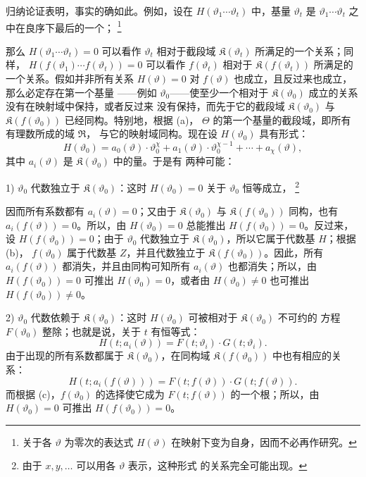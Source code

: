 \documentclass[11pt]{article}
\providecommand{\Kfield}{\mathfrak K}
\providecommand{\Rfield}{\mathfrak R}
\providecommand{\srcfn}[2]{%
  \begingroup\renewcommand{\thefootnote}{#1}\footnote{#2}\addtocounter{footnote}{-1}\endgroup}
\begin{document}
归纳论证表明，事实的确如此。例如，设在
\(H(\vartheta_1\cdots\vartheta_t)\) 中，基量 \(\vartheta_t\) 是
\(\vartheta_1\cdots\vartheta_t\) 之中在良序下最后的一个；
\srcfn{**)}{关于各 \(\vartheta\) 为零次的表达式 \(H(\vartheta)\)
在映射下变为自身，因而不必再作研究。} 那么
\(H(\vartheta_1\cdots\vartheta_t)=0\) 可以看作 \(\vartheta_t\)
相对于截段域 \(\Kfield(\vartheta_t)\) 所满足的一个关系；同样，
\(H(f(\vartheta_1)\cdots f(\vartheta_t))=0\) 可以看作
\(f(\vartheta_t)\) 相对于 \(\Kfield(f(\vartheta_t))\) 所满足的
一个关系。假如并非所有关系 \(H(\vartheta)=0\) 对
\(f(\vartheta)\) 也成立，且反过来也成立，那么必定存在第一个基量
——例如 \(\vartheta_0\)——使至少一个相对于
\(\Kfield(\vartheta_0)\) 成立的关系没有在映射域中保持，或者反过来
没有保持，而先于它的截段域 \(\Kfield(\vartheta_0)\) 与
\(\Kfield(f(\vartheta_0))\) 已经同构。特别地，根据 (a)，
\(\Theta\) 的第一个基量的截段域，即所有有理数所成的域 \(\Rfield\)，
与它的映射域同构。现在设 \(H(\vartheta_0)\) 具有形式：
\[
H(\vartheta_0)=a_0(\vartheta)\cdot\vartheta_0^\chi
+a_1(\vartheta)\cdot\vartheta_0^{\chi-1}+\cdots+a_\chi(\vartheta),
\]
其中 \(a_i(\vartheta)\) 是 \(\Kfield(\vartheta_0)\) 中的量。于是有
两种可能：

1) \(\vartheta_0\) 代数独立于 \(\Kfield(\vartheta_0)\)：这时
\(H(\vartheta_0)=0\) 关于 \(\vartheta_0\) 恒等成立，
\srcfn{*)}{由于 \(x,y,\ldots\) 可以用各 \(\vartheta\) 表示，这种形式
的关系完全可能出现。} 因而所有系数都有
\(a_i(\vartheta)=0\)；又由于 \(\Kfield(\vartheta_0)\) 与
\(\Kfield(f(\vartheta_0))\) 同构，也有
\(a_i(f(\vartheta))=0\)。所以，由 \(H(\vartheta_0)=0\) 总能推出
\(H(f(\vartheta_0))=0\)。反过来，设
\(H(f(\vartheta_0))=0\)；由于 \(\vartheta_0\) 代数独立于
\(\Kfield(\vartheta_0)\)，所以它属于代数基 \(H\)；根据 (b)，
\(f(\vartheta_0)\) 属于代数基 \(Z\)，并且代数独立于
\(\Kfield(f(\vartheta_0))\)。因此，所有
\(a_i(f(\vartheta))\) 都消失，并且由同构可知所有
\(a_i(\vartheta)\) 也都消失；所以，由
\(H(f(\vartheta_0))=0\) 可推出 \(H(\vartheta_0)=0\)，或者由
\(H(\vartheta_0)\ne0\) 也可推出 \(H(f(\vartheta_0))\ne0\)。

2) \(\vartheta_0\) 代数依赖于 \(\Kfield(\vartheta_0)\)：这时
\(H(\vartheta_0)\) 可被相对于 \(\Kfield(\vartheta_0)\) 不可约的
方程 \(F(\vartheta_0)\) 整除；也就是说，关于 \(t\) 有恒等式：
\[
H(t;a_i(\vartheta))=F(t;\vartheta_i)\cdot G(t;\vartheta_i).
\]
由于出现的所有系数都属于 \(\Kfield(\vartheta_0)\)，在同构域
\(\Kfield(f(\vartheta_0))\) 中也有相应的关系：
\[
H(t;a_i(f(\vartheta)))=F(t;f(\vartheta))\cdot G(t;f(\vartheta)).
\]
而根据 (c)，\(f(\vartheta_0)\) 的选择使它成为
\(F(t;f(\vartheta))\) 的一个根；所以，由 \(H(\vartheta_0)=0\)
可推出 \(H(f(\vartheta_0))=0\)。
\end{document}
